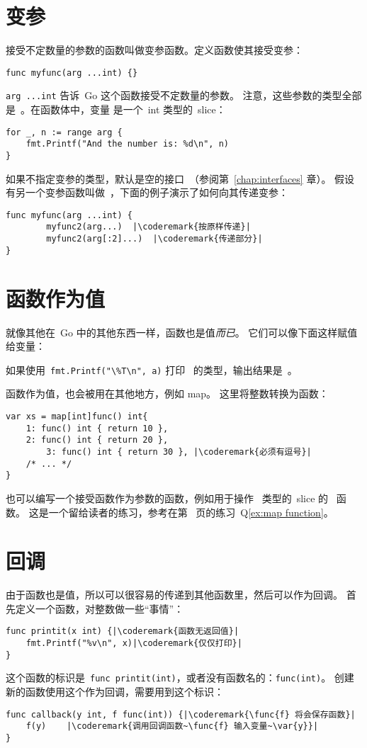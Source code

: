 \section{变参}
接受不定数量的参数的函数叫做变参函数。定义函数使其接受变参：
\begin{lstlisting}
func myfunc(arg ...int) {}
\end{lstlisting}
\lstinline{arg ...int} 告诉~Go 这个函数接受不定数量的参数。
注意，这些参数的类型全部是~。在函数体中，变量
 是一个~int 类型的~slice：
\begin{lstlisting}
for _, n := range arg {
    fmt.Printf("And the number is: %d\n", n)
}
\end{lstlisting}
如果不指定变参的类型，默认是空的接口~（参阅第~\ref{chap:interfaces} 章）。
假设有另一个变参函数叫做~，下面的例子演示了如何向其传递变参：
\begin{lstlisting}
func myfunc(arg ...int) {
        myfunc2(arg...)  |\coderemark{按原样传递}|
        myfunc2(arg[:2]...)  |\coderemark{传递部分}|
}
\end{lstlisting}

\section{函数作为值}
\label{sec:functions as values}
就像其他在~Go 中的其他东西一样，函数也是值\emph{而已}。
它们可以像下面这样赋值给变量：

如果使用~\lstinline{fmt.Printf("\%T\n", a)} 打印~ 的类型，输出结果是~。

函数作为值，也会被用在其他地方，例如 map。
这里将整数转换为函数：
\begin{lstlisting}[caption=使用 map 的函数作为值]
var xs = map[int]func() int{
    1: func() int { return 10 },
    2: func() int { return 20 },
        3: func() int { return 30 }, |\coderemark{必须有逗号}|
    /* ... */
}
\end{lstlisting}
也可以编写一个接受函数作为参数的函数，例如用于操作~ 类型的~slice 的~ 函数。
这是一个留给读者的练习，参考在第~\pageref{ex:map function} 页的练习~Q\ref{ex:map function}。

\section{回调}
\label{sec:callbacks}
由于函数也是值，所以可以很容易的传递到其他函数里，然后可以作为回调。
首先定义一个函数，对整数做一些``事情''：
\begin{lstlisting}
func printit(x int) {|\coderemark{函数无返回值}|
    fmt.Printf("%v\n", x)|\coderemark{仅仅打印}|
}
\end{lstlisting}
这个函数的标识是~\lstinline{func printit(int)}，或者没有函数名的：\mbox{\lstinline{func(int)}}。
创建新的函数使用这个作为回调，需要用到这个标识：
\begin{lstlisting}
func callback(y int, f func(int)) {|\coderemark{\func{f} 将会保存函数}|
    f(y)    |\coderemark{调用回调函数~\func{f} 输入变量~\var{y}}|
}
\end{lstlisting}

